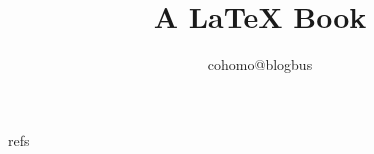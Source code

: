 \documentclass{book}
\begin{document}
\title{A LaTeX Book}
\author{cohomo@blogbus}
\date{}
\maketitle




refs

\printbibliography
\end{document}
